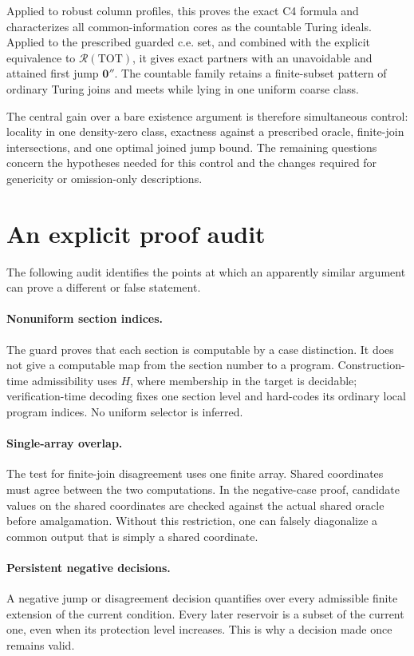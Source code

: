 \documentclass[11pt,letterpaper]{article}
\theoremstyle{definition}
\theoremstyle{remark}\newtheorem{remark}[theorem]{Remark}
\numberwithin{equation}{section}
\newcommand{\TOT}{\mathrm{TOT}}
\newcommand{\Rc}{\mathcal R}
\newcommand{\zero}{\mathbf 0}
\begin{document}
Applied to robust column profiles, this proves the exact C4 formula and characterizes all common-information cores as the countable Turing ideals. Applied to the prescribed guarded c.e. set, and combined with the explicit equivalence to $\Rc(\TOT)$, it gives exact partners with an unavoidable and attained first jump $\zero''$. The countable family retains a finite-subset pattern of ordinary Turing joins and meets while lying in one uniform coarse class.

The central gain over a bare existence argument is therefore simultaneous control: locality in one density-zero class, exactness against a prescribed oracle, finite-join intersections, and one optimal joined jump bound. The remaining questions concern the hypotheses needed for this control and the changes required for genericity or omission-only descriptions.

\appendix
\section{An explicit proof audit}
\label{cr13:app:audit}
The following audit identifies the points at which an apparently similar argument can prove a different or false statement.

\paragraph{Nonuniform section indices.}
The guard proves that each section is computable by a case distinction. It does not give a computable map from the section number to a program. Construction-time admissibility uses $H$, where membership in the target is decidable; verification-time decoding fixes one section level and hard-codes its ordinary local program indices. No uniform selector is inferred.

\paragraph{Single-array overlap.}
The test for finite-join disagreement uses one finite array. Shared coordinates must agree between the two computations. In the negative-case proof, candidate values on the shared coordinates are checked against the actual shared oracle before amalgamation. Without this restriction, one can falsely diagonalize a common output that is simply a shared coordinate.

\paragraph{Persistent negative decisions.}
A negative jump or disagreement decision quantifies over every admissible finite extension of the current condition. Every later reservoir is a subset of the current one, even when its protection level increases. This is why a decision made once remains valid.
\end{document}
